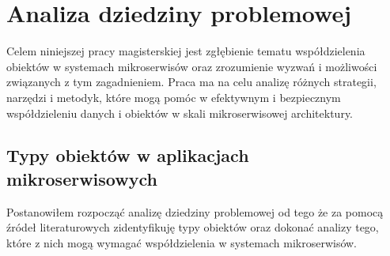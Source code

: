 \documentclass[runningheads,12pt]{llncs}
\begin{document}
\newpage

\section{Analiza dziedziny problemowej}

Celem niniejszej pracy magisterskiej jest zgłębienie tematu współdzielenia obiektów w systemach mikroserwisów oraz zrozumienie wyzwań i możliwości związanych z tym zagadnieniem. Praca ma na celu analizę różnych strategii, narzędzi i metodyk, które mogą pomóc w efektywnym i bezpiecznym współdzieleniu danych i obiektów w skali mikroserwisowej architektury.

\subsection{Typy obiektów w aplikacjach mikroserwisowych}

Postanowiłem rozpocząć analizę dziedziny problemowej od tego że za pomocą źródeł literaturowych zidentyfikuję typy obiektów oraz dokonać analizy tego, które z nich mogą wymagać współdzielenia w systemach mikroserwisów.
\end{document}
